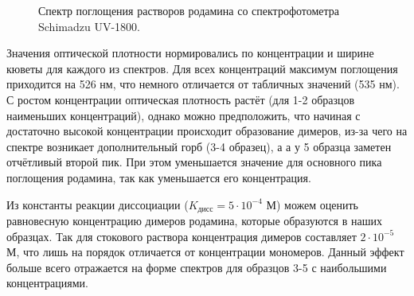 \documentclass{article}
\begin{document}
\begin{figure}[h!]
    \caption{Спектр поглощения растворов родамина со спектрофотометра Schimadzu UV-1800.}
\end{figure}
\par Значения оптической плотности нормировались по концентрации и ширине кюветы для каждого из спектров. Для всех концентраций максимум поглощения приходится на 526 нм, что немного отличается от табличных значений (535 нм). С ростом концентрации оптическая плотность растёт (для 1-2 образцов наименьших концентраций), однако можно предположить, что начиная с достаточно высокой концентрации происходит образование димеров, из-за чего на спектре возникает дополнительный горб (3-4 образец), а а у 5 образца заметен отчётливый второй пик. При этом уменьшается значение для основного пика поглощения родамина, так как уменьшается его концентрация.
\par Из константы реакции диссоциации ($K_{дисс} = 5 \cdot 10^{-4}$ М) можем оценить равновесную концентрацию димеров родамина, которые образуются в наших образцах. Так для стокового раствора концентрация димеров составляет $2 \cdot 10^{-5}$ М, что лишь на порядок отличается от концентрации мономеров. Данный эффект больше всего отражается на форме спектров для образцов 3-5 с наибольшими концентрациями.
\end{document}
